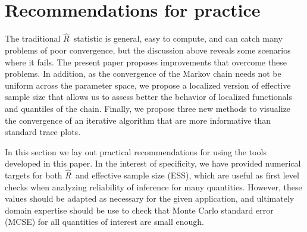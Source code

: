 \documentclass[american,]{article}
\newcommand{\Rhat}{$\widehat{R}$}
\newcommand{\sRhat}{split-$\widehat{R}$}
\theoremstyle{definition}
\begin{document}


\section{Recommendations for practice}


The traditional \Rhat\ statistic is general, easy to compute, and can
catch many problems of poor convergence, but the discussion above
reveals some scenarios where it fails. The present paper proposes
improvements that overcome these problems.
%
In addition, as the convergence
of the Markov chain needs not be uniform across the parameter space, we
propose a localized version of effective sample size
that allows us to assess better the behavior of localized 
functionals and quantiles of the chain.
Finally, we propose three new methods to visualize the 
convergence of an iterative algorithm that are more informative than standard 
trace plots.

In this section we lay out practical recommendations for using the tools 
developed in this paper. In the interest of specificity, we have 
provided numerical targets for both \Rhat\ and effective sample size (ESS),
which are useful as first level checks when analyzing reliability of inference for
many quantities. However, these values should be adapted as necessary for the given
application, and ultimately domain expertise should be use to check that Monte Carlo
standard error (MCSE) for all quantities of interest are small enough.
\end{document}
